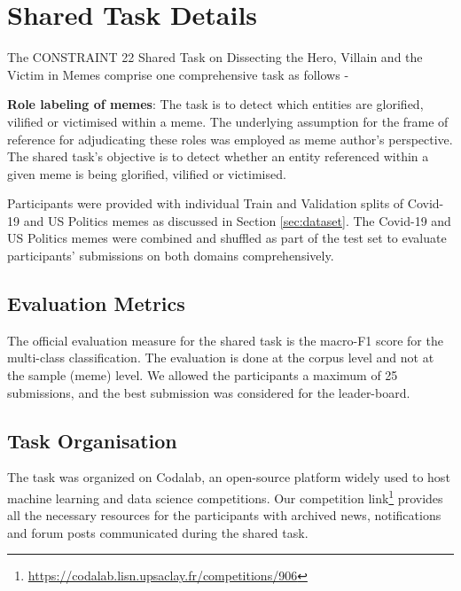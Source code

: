 \documentclass[11pt]{article}
\begin{document}
\section{Shared Task Details}
The CONSTRAINT 22 Shared Task on Dissecting the Hero, Villain and the Victim in Memes comprise one comprehensive task as follows - \par
\textbf{Role labeling of memes}: The task is to detect which entities are glorified, vilified or victimised within a meme. The underlying assumption for the frame of reference for adjudicating these roles was employed as meme author's perspective. The shared task's objective is to detect whether an entity referenced within a given meme is being glorified, vilified or victimised.\par

Participants were provided with individual Train and Validation splits of Covid-19 and US Politics memes as discussed in Section \ref{sec:dataset}. The Covid-19 and US Politics memes were combined and shuffled as part of the test set to evaluate participants' submissions on both domains comprehensively. 

\subsection{Evaluation Metrics}
The official evaluation measure for the shared task is the macro-F1 score for the multi-class classification. The evaluation is done at the corpus level and not at the sample (meme) level. We allowed the participants a maximum of 25 submissions, and the best submission was considered for the leader-board.  

\subsection{Task Organisation}
The task was organized on Codalab, an open-source platform widely used to host machine learning and data science competitions. Our competition link\footnote{\url{https://codalab.lisn.upsaclay.fr/competitions/906}} provides all the necessary resources for the participants with archived news, notifications and forum posts communicated during the shared task.


\end{document}
